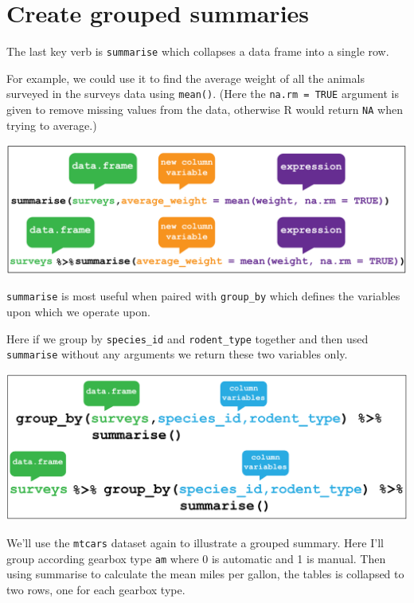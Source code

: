 \documentclass[12pt,]{book}
\theoremstyle{definition}
\theoremstyle{definition}
\theoremstyle{definition}
\theoremstyle{remark}
\begin{document}
\section{Create grouped summaries}\label{create-grouped-summaries}

The last key verb is \texttt{summarise} which collapses a data frame
into a single row.

For example, we could use it to find the average weight of all the
animals surveyed in the surveys data using \texttt{mean()}. (Here the
\texttt{na.rm\ =\ TRUE} argument is given to remove missing values from
the data, otherwise R would return \texttt{NA} when trying to average.)

\begin{center}\includegraphics[width=0.8\linewidth]{img/dplyr_summarise} \end{center}

\texttt{summarise} is most useful when paired with \texttt{group\_by}
which defines the variables upon which we operate upon.

Here if we group by \texttt{species\_id} and \texttt{rodent\_type}
together and then used \texttt{summarise} without any arguments we
return these two variables only.

\begin{center}\includegraphics[width=0.8\linewidth]{img/dplyr_group_by} \end{center}

We'll use the \texttt{mtcars} dataset again to illustrate a grouped
summary. Here I'll group according gearbox type \texttt{am} where 0 is
automatic and 1 is manual. Then using summarise to calculate the mean
miles per gallon, the tables is collapsed to two rows, one for each
gearbox type.
\end{document}
